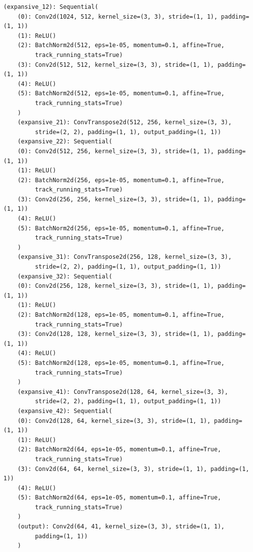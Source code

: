 \begin{lstlisting}[caption={Unet Vanilla model architecture description},label=lst:unetbaseline]
	(expansive_12): Sequential(
	(0): Conv2d(1024, 512, kernel_size=(3, 3), stride=(1, 1), padding=(1, 1))
	(1): ReLU()
	(2): BatchNorm2d(512, eps=1e-05, momentum=0.1, affine=True, 
	     track_running_stats=True)
	(3): Conv2d(512, 512, kernel_size=(3, 3), stride=(1, 1), padding=(1, 1))
	(4): ReLU()
	(5): BatchNorm2d(512, eps=1e-05, momentum=0.1, affine=True, 
	     track_running_stats=True)
	)
	(expansive_21): ConvTranspose2d(512, 256, kernel_size=(3, 3), 
	     stride=(2, 2), padding=(1, 1), output_padding=(1, 1))
	(expansive_22): Sequential(
	(0): Conv2d(512, 256, kernel_size=(3, 3), stride=(1, 1), padding=(1, 1))
	(1): ReLU()
	(2): BatchNorm2d(256, eps=1e-05, momentum=0.1, affine=True, 
	     track_running_stats=True)
	(3): Conv2d(256, 256, kernel_size=(3, 3), stride=(1, 1), padding=(1, 1))
	(4): ReLU()
	(5): BatchNorm2d(256, eps=1e-05, momentum=0.1, affine=True, 
	     track_running_stats=True)
	)
	(expansive_31): ConvTranspose2d(256, 128, kernel_size=(3, 3), 
	     stride=(2, 2), padding=(1, 1), output_padding=(1, 1))
	(expansive_32): Sequential(
	(0): Conv2d(256, 128, kernel_size=(3, 3), stride=(1, 1), padding=(1, 1))
	(1): ReLU()
	(2): BatchNorm2d(128, eps=1e-05, momentum=0.1, affine=True, 
	     track_running_stats=True)
	(3): Conv2d(128, 128, kernel_size=(3, 3), stride=(1, 1), padding=(1, 1))
	(4): ReLU()
	(5): BatchNorm2d(128, eps=1e-05, momentum=0.1, affine=True, 
	     track_running_stats=True)
	)
	(expansive_41): ConvTranspose2d(128, 64, kernel_size=(3, 3), 
	     stride=(2, 2), padding=(1, 1), output_padding=(1, 1))
	(expansive_42): Sequential(
	(0): Conv2d(128, 64, kernel_size=(3, 3), stride=(1, 1), padding=(1, 1))
	(1): ReLU()
	(2): BatchNorm2d(64, eps=1e-05, momentum=0.1, affine=True, 
	     track_running_stats=True)
	(3): Conv2d(64, 64, kernel_size=(3, 3), stride=(1, 1), padding=(1, 1))
	(4): ReLU()
	(5): BatchNorm2d(64, eps=1e-05, momentum=0.1, affine=True, 
	     track_running_stats=True)
	)
	(output): Conv2d(64, 41, kernel_size=(3, 3), stride=(1, 1), 
	     padding=(1, 1))
	)
	\end{lstlisting}
	

